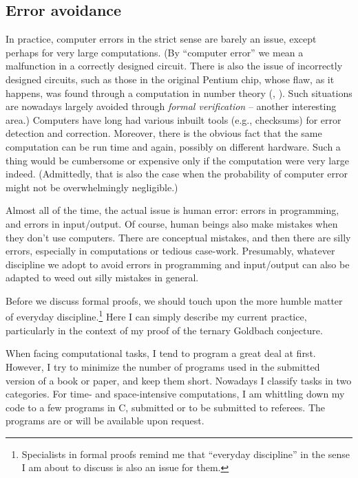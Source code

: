   
\subsection{Error avoidance}

In practice, computer errors in the strict sense
are barely an issue, except perhaps for very large computations. (By
``computer error'' we mean a malfunction in a correctly designed circuit.
There is also the issue of incorrectly designed circuits, such as those in the
original Pentium chip, whose flaw, as it happens, was found through a
computation in number theory (\cite{Pentium}, \cite{cipra1995number}).
Such situations are nowadays largely avoided
through {\em formal verification} -- another interesting area.)
Computers have long had various inbuilt tools (e.g., checksums) for error
detection and correction. Moreover, there is the obvious fact that the same
computation can be run time and again, possibly on different hardware.
Such a thing would be cumbersome or expensive
only if the computation were very large indeed.
(Admittedly, that is also the case when the probability of computer
error might not be overwhelmingly negligible.)

Almost all of the time, the actual issue is human error: errors in programming,
and errors in input/output. Of course, human beings
also make mistakes when they don't use computers. There are conceptual
mistakes, and then there are silly errors,
especially in computations or tedious case-work. Presumably, whatever discipline
we adopt to avoid errors in programming and input/output can also be adapted
to weed out silly mistakes in general.

Before we discuss formal proofs, we should touch upon the more humble matter
of everyday discipline.\footnote{Specialists in formal proofs remind me that
  ``everyday discipline'' in the sense I am about to discuss is also an issue
  for them.}
Here I can simply describe my current practice,
particularly in the context of my proof of the ternary Goldbach
conjecture. 

When facing computational tasks, I tend to program a great deal at first.
However, I
try to minimize the number of programs used in the submitted version of
a book or paper, and keep them short. Nowadays I classify tasks in two
categories. For time- and
space-intensive computations, I am whittling down my code to a few programs
in C, submitted or to be submitted to referees. The programs are or will be
available upon request. 

